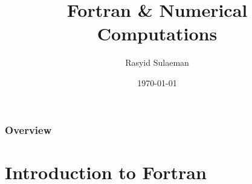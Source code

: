 \documentclass{beamer}
\title[Workshop TCMP]{Fortran \& Numerical Computations} %
\author{Rasyid Sulaeman} %
\institute[UCLA] %
{
University of Indonesia \\ %
\medskip
\textit{rasyid.sulaeman@ui.ac.id} %
}
\date{\today} %
\begin{document}
\begin{frame}
\titlepage %
\end{frame}

\begin{frame}
\frametitle{Overview} %
\tableofcontents %
\end{frame}


\section{Introduction to Fortran} 
\end{document}
